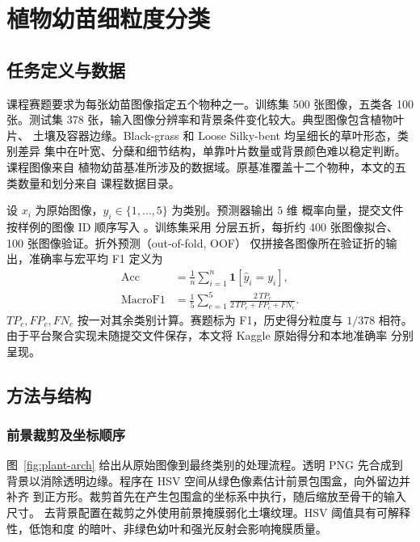 \chapter{植物幼苗细粒度分类}
\label{chap:plant}

\section{任务定义与数据}
课程赛题要求为每张幼苗图像指定五个物种之一。训练集 500 张图像，五类各
100 张。测试集 378 张，输入图像分辨率和背景条件变化较大。典型图像包含植物叶片、
土壤及容器边缘。Black-grass 和 Loose Silky-bent 均呈细长的草叶形态，类别差异
集中在叶宽、分蘖和细节结构，单靠叶片数量或背景颜色难以稳定判断。课程图像来自
植物幼苗基准所涉及的数据域。原基准覆盖十二个物种，本文的五类数量和划分来自
课程数据目录\citep{giselsson2017plants}。

设 $x_i$ 为原始图像，$y_i\in\{1,\ldots,5\}$ 为类别。预测器输出 $5$ 维
概率向量，提交文件按样例的图像 ID 顺序写入 。训练集采用
分层五折，每折约 400 张图像拟合、100 张图像验证。折外预测（out-of-fold, OOF）
仅拼接各图像所在验证折的输出，准确率与宏平均 F1 定义为
\begin{align}
  \mathrm{Acc}&=\frac{1}{n}\sum_{i=1}^n\mathbf 1[\hat y_i=y_i],\\
  \mathrm{MacroF1}&=\frac{1}{5}\sum_{c=1}^{5}
          \frac{2\,TP_c}{2\,TP_c+FP_c+FN_c}.
\end{align}
$TP_c,FP_c,FN_c$ 按一对其余类别计算。赛题标为 F1，历史得分粒度与 $1/378$
相符。由于平台聚合实现未随提交文件保存，本文将 Kaggle 原始得分和本地准确率
分别呈现。

\section{方法与结构}

\subsection{前景裁剪及坐标顺序}
图~\ref{fig:plant-arch} 给出从原始图像到最终类别的处理流程。透明 PNG 先合成到
背景以消除透明边缘。程序在 HSV 空间从绿色像素估计前景包围盒，向外留边并补齐
到正方形。裁剪首先在产生包围盒的坐标系中执行，随后缩放至骨干的输入尺寸。
去背景配置在裁剪之外使用前景掩膜弱化土壤纹理。HSV 阈值具有可解释性，低饱和度
的暗叶、非绿色幼叶和强光反射会影响掩膜质量。


